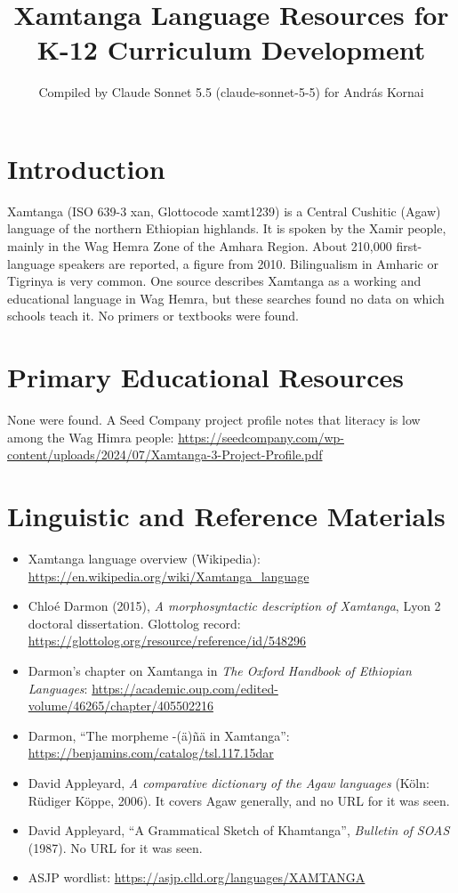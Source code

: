 \documentclass[12pt]{article}
\title{Xamtanga Language Resources for K-12 Curriculum Development}
\author{Compiled by Claude Sonnet 5.5 (claude-sonnet-5-5) for Andr\'as Kornai}
\date{}
\begin{document}
\maketitle

\section{Introduction}
Xamtanga (ISO 639-3 xan, Glottocode xamt1239) is a Central Cushitic (Agaw) language of the northern Ethiopian highlands. It is spoken by the Xamir people, mainly in the Wag Hemra Zone of the Amhara Region. About 210,000 first-language speakers are reported, a figure from 2010. Bilingualism in Amharic or Tigrinya is very common. One source describes Xamtanga as a working and educational language in Wag Hemra, but these searches found no data on which schools teach it. No primers or textbooks were found.

\section{Primary Educational Resources}
None were found. A Seed Company project profile notes that literacy is low among the Wag Himra people: \url{https://seedcompany.com/wp-content/uploads/2024/07/Xamtanga-3-Project-Profile.pdf}

\section{Linguistic and Reference Materials}
\begin{itemize}
\item Xamtanga language overview (Wikipedia): \url{https://en.wikipedia.org/wiki/Xamtanga_language}
\item Chlo\'e Darmon (2015), \emph{A morphosyntactic description of Xamtanga}, Lyon 2 doctoral dissertation. Glottolog record: \url{https://glottolog.org/resource/reference/id/548296}
\item Darmon's chapter on Xamtanga in \emph{The Oxford Handbook of Ethiopian Languages}: \url{https://academic.oup.com/edited-volume/46265/chapter/405502216}
\item Darmon, ``The morpheme -(\"a)\~n\"a in Xamtanga'': \url{https://benjamins.com/catalog/tsl.117.15dar}
\item David Appleyard, \emph{A comparative dictionary of the Agaw languages} (K\"oln: R\"udiger K\"oppe, 2006). It covers Agaw generally, and no URL for it was seen.
\item David Appleyard, ``A Grammatical Sketch of Khamtanga'', \emph{Bulletin of SOAS} (1987). No URL for it was seen.
\item ASJP wordlist: \url{https://asjp.clld.org/languages/XAMTANGA}
\end{itemize}
\end{document}
